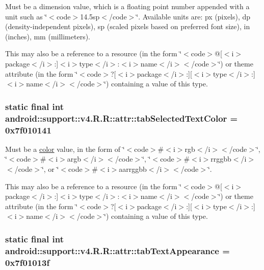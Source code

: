 Must be a dimension value, which is a floating point number appended with a unit such as \char`\"{}$<$code$>$14.5sp$<$/code$>$\char`\"{}. Available units are: px (pixels), dp (density-independent pixels), sp (scaled pixels based on preferred font size), in (inches), mm (millimeters). 

This may also be a reference to a resource (in the form \char`\"{}$<$code$>$@\mbox{[}$<$i$>$package$<$/i$>$:\mbox{]}$<$i$>$type$<$/i$>$:$<$i$>$name$<$/i$>$$<$/code$>$\char`\"{}) or theme attribute (in the form \char`\"{}$<$code$>$?\mbox{[}$<$i$>$package$<$/i$>$:\mbox{]}\mbox{[}$<$i$>$type$<$/i$>$:\mbox{]}$<$i$>$name$<$/i$>$$<$/code$>$\char`\"{}) containing a value of this type. \hypertarget{classandroid_1_1support_1_1v4_1_1_r_1_1attr_02912e41f6b2e68b8c38b71075f5db62}{
\subsubsection[{tabSelectedTextColor}]{\setlength{\rightskip}{0pt plus 5cm}static final int android::support::v4.R.R::attr::tabSelectedTextColor = 0x7f010141}}
\label{classandroid_1_1support_1_1v4_1_1_r_1_1attr_02912e41f6b2e68b8c38b71075f5db62}


Must be a \hyperlink{classandroid_1_1support_1_1v4_1_1_r_1_1color}{color} value, in the form of \char`\"{}$<$code$>$\#$<$i$>$rgb$<$/i$>$$<$/code$>$\char`\"{}, \char`\"{}$<$code$>$\#$<$i$>$argb$<$/i$>$$<$/code$>$\char`\"{}, \char`\"{}$<$code$>$\#$<$i$>$rrggbb$<$/i$>$$<$/code$>$\char`\"{}, or \char`\"{}$<$code$>$\#$<$i$>$aarrggbb$<$/i$>$$<$/code$>$\char`\"{}. 

This may also be a reference to a resource (in the form \char`\"{}$<$code$>$@\mbox{[}$<$i$>$package$<$/i$>$:\mbox{]}$<$i$>$type$<$/i$>$:$<$i$>$name$<$/i$>$$<$/code$>$\char`\"{}) or theme attribute (in the form \char`\"{}$<$code$>$?\mbox{[}$<$i$>$package$<$/i$>$:\mbox{]}\mbox{[}$<$i$>$type$<$/i$>$:\mbox{]}$<$i$>$name$<$/i$>$$<$/code$>$\char`\"{}) containing a value of this type. \hypertarget{classandroid_1_1support_1_1v4_1_1_r_1_1attr_b66b687353f46eac0a74ced92d773205}{
\subsubsection[{tabTextAppearance}]{\setlength{\rightskip}{0pt plus 5cm}static final int android::support::v4.R.R::attr::tabTextAppearance = 0x7f01013f}}
\label{classandroid_1_1support_1_1v4_1_1_r_1_1attr_b66b687353f46eac0a74ced92d773205}


